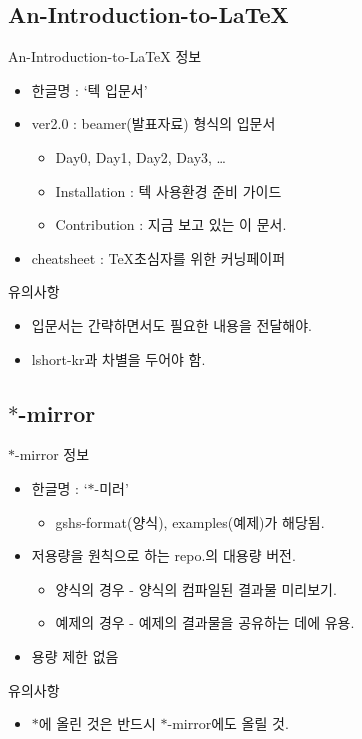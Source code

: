 \documentclass[12pt]{beamer}
\begin{document}
\subsection{An-Introduction-to-LaTeX}
\begin{frame}{An-Introduction-to-LaTeX}
	정보
	\begin{itemize}
		\item 한글명 : `텍 입문서'
		\item ver2.0 : beamer(발표자료) 형식의 입문서
		\begin{itemize}
			\item Day0, Day1, Day2, Day3, \ldots
			\item Installation : 텍 사용환경 준비 가이드
			\item Contribution : 지금 보고 있는 이 문서.
		\end{itemize}
		\item cheatsheet : \TeX 초심자를 위한 커닝페이퍼
	\end{itemize}
	\vfill
	유의사항
	\begin{itemize}
		\item 입문서는 간략하면서도 필요한 내용을 전달해야.
		\item lshort-kr과 차별을 두어야 함.
	\end{itemize}
	\vfill
\end{frame}
\subsection{$ \ast $-mirror}
\begin{frame}{$ \ast $-mirror}
	정보
	\begin{itemize}
		\item 한글명 : `$ \ast $-미러'
		\begin{itemize}
			\item gshs-format(양식), examples(예제)가 해당됨.
		\end{itemize}
		\item 저용량을 원칙으로 하는 repo.의 대용량 버전.
		\begin{itemize}
			\item 양식의 경우 - 양식의 컴파일된 결과물 미리보기.
			\item 예제의 경우 - 예제의 결과물을 공유하는 데에 유용.
		\end{itemize}
		\item 용량 제한 없음
	\end{itemize}
	\vfill
	유의사항
	\begin{itemize}
		\item $ \ast $에 올린 것은 반드시 $ \ast $-mirror에도 올릴 것.
	\end{itemize}
	\vfill
\end{frame}
\end{document}
